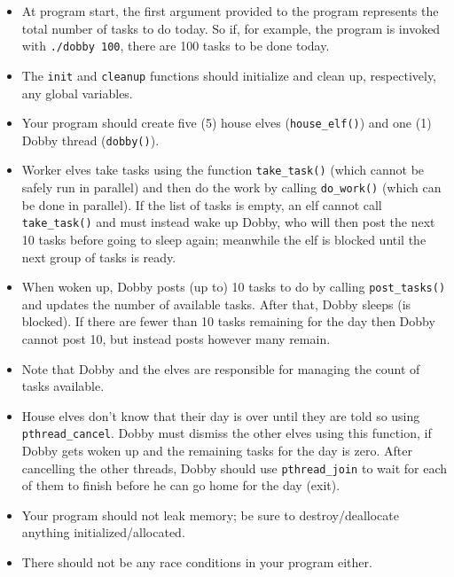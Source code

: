 \begin{itemize}
	\item At program start, the first argument provided to the program represents the total number of tasks to do today. So if, for example, the program is invoked with \texttt{./dobby 100}, there are 100 tasks to be done today.

	\item The \texttt{init} and \texttt{cleanup} functions should initialize and clean up, respectively, any global variables. 

	\item Your program should create five (5) house elves (\texttt{house\_elf()}) and one (1) Dobby thread (\texttt{dobby()}). 

	\item Worker elves take tasks using the function 
\texttt{take\_task()} (which cannot be safely run in parallel) and then do the work by 
calling \texttt{do\_work()} (which can be done in parallel). If the list of tasks is 
empty, an elf cannot call \texttt{take\_task()} and must instead wake up Dobby, who will then post the next 10 tasks before going to sleep again; meanwhile the elf is blocked until the next group of tasks is ready.

	\item When woken up, Dobby posts (up to) 10 tasks to do by calling \texttt{post\_tasks()} and updates the number of available tasks. After that, Dobby sleeps (is blocked). If there are fewer than 10 tasks remaining for the day then Dobby cannot post 10, but instead posts however many remain.
	
\item  Note that Dobby and the elves are responsible for managing the count of tasks available.

\item House elves don't know that their day is over until they are told so using \texttt{pthread\_cancel}. Dobby must dismiss the other elves using this function, if Dobby gets woken up and the remaining tasks for the day is zero. After cancelling the other threads, Dobby should use \texttt{pthread\_join} to wait for each of them to finish before he can go home for the day (exit).

\item Your program should not leak memory; be sure to destroy/deallocate anything initialized/allocated.

\item There should not be any race conditions in your program either.
\end{itemize}


